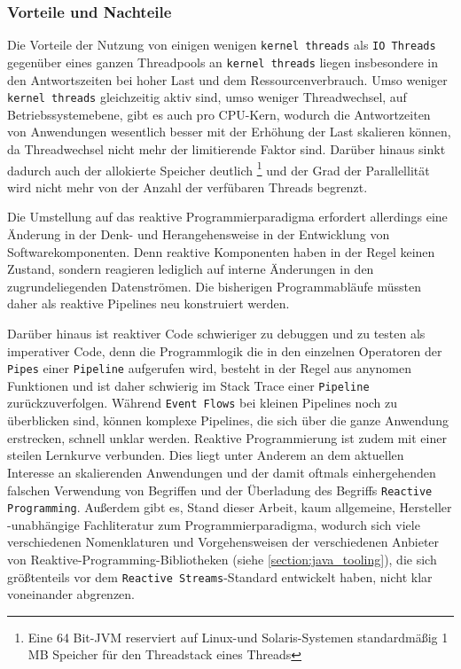 \subsubsection{Vorteile und Nachteile}
\label{section:vorteile_nachteile}

Die Vorteile der Nutzung von einigen wenigen \verb|kernel threads| als \verb|IO Threads| gegenüber eines ganzen Threadpools
an \verb|kernel threads| liegen insbesondere in den Antwortszeiten bei hoher Last und dem Ressourcenverbrauch.
Umso weniger \verb|kernel threads| gleichzeitig aktiv sind, umso weniger Threadwechsel, auf Betriebssystemebene,
gibt es auch pro CPU-Kern, wodurch die Antwortzeiten von Anwendungen
wesentlich besser mit der Erhöhung der Last skalieren können, da Threadwechsel nicht mehr der limitierende Faktor sind.
Darüber hinaus sinkt dadurch auch der allokierte Speicher deutlich
\footnote{Eine 64 Bit-JVM reserviert auf Linux-und Solaris-Systemen standardmäßig 1 MB Speicher für den Threadstack eines Threads}
und der Grad der Parallellität wird nicht mehr von der Anzahl der verfübaren Threads begrenzt.

Die Umstellung auf das reaktive Programmierparadigma erfordert allerdings eine Änderung in der Denk- und Herangehensweise in der
Entwicklung von Softwarekomponenten. Denn reaktive Komponenten haben in der Regel keinen Zustand,
sondern reagieren lediglich auf interne Änderungen in den zugrundeliegenden Datenströmen.
Die bisherigen Programmabläufe müssten daher als reaktive Pipelines neu konstruiert werden.

Darüber hinaus ist reaktiver Code schwieriger zu debuggen und zu testen als imperativer Code, denn die Programmlogik die in den einzelnen Operatoren
der \verb|Pipes| einer \verb|Pipeline| aufgerufen wird, besteht in der Regel aus anynomen Funktionen und ist daher schwierig im Stack Trace einer
\verb|Pipeline| zurückzuverfolgen.
Während \verb|Event Flows| bei kleinen Pipelines noch zu überblicken sind, können komplexe Pipelines, die sich über die ganze Anwendung erstrecken,
schnell unklar werden.
Reaktive Programmierung ist zudem mit einer steilen Lernkurve verbunden. Dies liegt unter Anderem an dem aktuellen Interesse an skalierenden
Anwendungen und der damit oftmals einhergehenden falschen Verwendung von Begriffen und der Überladung des Begriffs \verb|Reactive Programming|.
Außerdem gibt es, Stand dieser Arbeit, kaum allgemeine, Hersteller
-unabhängige Fachliteratur zum Programmierparadigma, wodurch sich viele verschiedenen Nomenklaturen und Vorgehensweisen der verschiedenen Anbieter von
Reaktive-Programming-Bibliotheken (siehe \ref{section:java_tooling}), die sich größtenteils vor dem \verb|Reactive Streams|-Standard entwickelt haben,
nicht klar voneinander abgrenzen.

